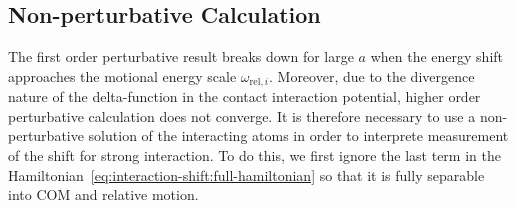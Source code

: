 \subsection{Non-perturbative Calculation}
\label{ch:interaction-shift:theory:non-perturb}

The first order perturbative result breaks down for large $a$ when the energy shift
approaches the motional energy scale $\omega_{\mathrm{rel},i}$.
Moreover, due to the divergence nature of the delta-function in the contact interaction potential,
higher order perturbative calculation does not converge.
It is therefore necessary to use a non-perturbative solution of the interacting atoms
in order to interprete measurement of the shift for strong interaction.
To do this, we first ignore the last term in
the Hamiltonian~\ref{eq:interaction-shift:full-hamiltonian} so that it is fully separable
into COM and relative motion.

